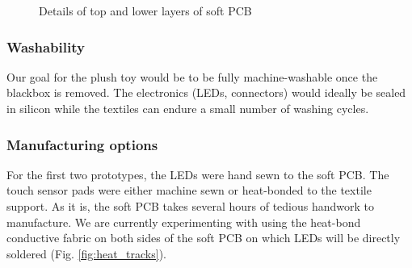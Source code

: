 \begin{figure}[H]
    \centering
    \hfill
    \hfill
    \caption{Details of top and lower layers of soft PCB} 
    \label{fig:soft_pcb}
\end{figure}

\subsubsection{Washability} Our goal for the plush toy would be to be fully machine-washable once the blackbox is removed. The electronics (LEDs, connectors) would ideally be sealed in silicon while the textiles can endure a small number of washing cycles.

\subsubsection{Manufacturing options} For the first two prototypes, the LEDs were hand sewn to the soft PCB. The touch sensor pads were either machine sewn or heat-bonded to the textile support. As it is, the soft PCB takes several hours of tedious handwork to manufacture. We are currently experimenting with using the heat-bond conductive fabric on both sides of the soft PCB on which LEDs will be directly soldered (Fig. \ref{fig:heat_tracks}). 

